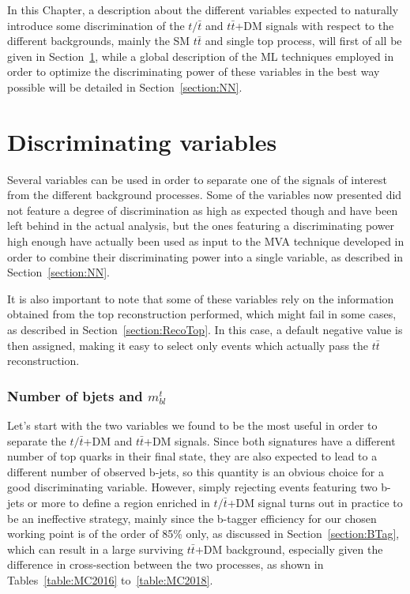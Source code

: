 \documentclass[a4paper, 10pt, openright]{report}
\begin{document}
In this Chapter, a description about the different variables expected to naturally introduce some discrimination of the $t/\bar t$ and $t \bar t$+DM signals with respect to the different backgrounds, mainly the \ac{SM} $t \bar t$ and single top process, will first of all be given in Section~\ref{section:Variables}, while a global description of the \ac{ML} techniques employed in order to optimize the discriminating power of these variables in the best way possible will be detailed in Section~\ref{section:NN}.

\section{Discriminating variables} \label{section:Variables}

Several variables can be used in order to separate one of the signals of interest from the different background processes. Some of the variables now presented did not feature a degree of discrimination as high as expected though and have been left behind in the actual analysis, but the ones featuring a discriminating power high enough have actually been used as input to the \ac{MVA} technique developed in order to combine their discriminating power into a single variable, as described in Section~\ref{section:NN}. 

It is also important to note that some of these variables rely on the information obtained from the top reconstruction performed, which might fail in some cases, as described in Section~\ref{section:RecoTop}. In this case, a default negative value is then assigned, making it easy to select only events which actually pass the $t \bar t$ reconstruction.

\subsubsection*{Number of bjets and $m_{bl}^t$}

Let's start with the two variables we found to be the most useful in order to separate the $t/\bar t$+DM and $t \bar t$+DM signals. Since both signatures have a different number of top quarks in their final state, they are also expected to lead to a different number of observed b-jets, so this quantity is an obvious choice for a good discriminating variable. However, simply rejecting events featuring two b-jets or more to define a region enriched in $t/ \bar t$+DM signal turns out in practice to be an ineffective strategy, mainly since the b-tagger efficiency for our chosen working point is of the order of 85\% only, as discussed in Section~\ref{section:BTag}, which can result in a large surviving $t \bar t$+DM background, especially given the difference in cross-section between the two processes, as shown in Tables~\ref{table:MC2016} to~\ref{table:MC2018}.
\end{document}
